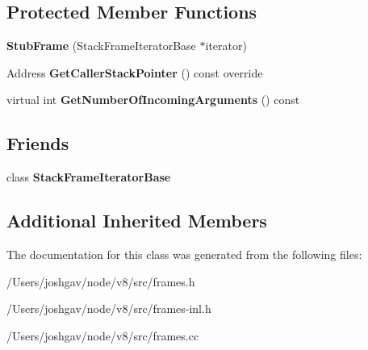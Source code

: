 \subsection*{Protected Member Functions}
\begin{DoxyCompactItemize}
\item 
{\bfseries Stub\+Frame} (Stack\+Frame\+Iterator\+Base $\ast$iterator)\hypertarget{classv8_1_1internal_1_1_stub_frame_af20ec1c34864746407ce4748856a4d66}{}\label{classv8_1_1internal_1_1_stub_frame_af20ec1c34864746407ce4748856a4d66}

\item 
Address {\bfseries Get\+Caller\+Stack\+Pointer} () const  override\hypertarget{classv8_1_1internal_1_1_stub_frame_a6a496590d2822d58bdfa35a53c4f823b}{}\label{classv8_1_1internal_1_1_stub_frame_a6a496590d2822d58bdfa35a53c4f823b}

\item 
virtual int {\bfseries Get\+Number\+Of\+Incoming\+Arguments} () const \hypertarget{classv8_1_1internal_1_1_stub_frame_acb6d45ab626884ee0980379533f6bf3c}{}\label{classv8_1_1internal_1_1_stub_frame_acb6d45ab626884ee0980379533f6bf3c}

\end{DoxyCompactItemize}
\subsection*{Friends}
\begin{DoxyCompactItemize}
\item 
class {\bfseries Stack\+Frame\+Iterator\+Base}\hypertarget{classv8_1_1internal_1_1_stub_frame_ac7310421866976ca454bbe11c5f926c3}{}\label{classv8_1_1internal_1_1_stub_frame_ac7310421866976ca454bbe11c5f926c3}

\end{DoxyCompactItemize}
\subsection*{Additional Inherited Members}


The documentation for this class was generated from the following files\+:\begin{DoxyCompactItemize}
\item 
/\+Users/joshgav/node/v8/src/frames.\+h\item 
/\+Users/joshgav/node/v8/src/frames-\/inl.\+h\item 
/\+Users/joshgav/node/v8/src/frames.\+cc\end{DoxyCompactItemize}
